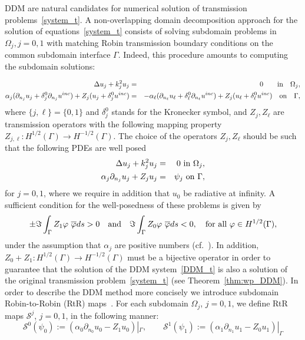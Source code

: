 \documentclass[11pt]{article}
\numberwithin{equation}{section}
\begin{document}
DDM are natural candidates for numerical solution of transmission problems~\eqref{system_t}. A non-overlapping domain decomposition approach for the solution of equations~\eqref{system_t} consists of solving subdomain problems in $\Omega_j,j=0,1$ with matching Robin transmission boundary conditions on the common subdomain interface $\Gamma$. Indeed, this procedure amounts to computing the subdomain solutions:

\begin{eqnarray}\label{DDM_t}
  \Delta u_j +k_j^2 u_j &=&0\qquad {\rm in}\quad \Omega_j,\\
  \alpha_j(\partial_{n_j}u_j+\delta_j^0\partial_{n_j}u^{inc})+Z_j(u_j+\delta_j^0 u^{inc})&=&-\alpha_\ell(\partial_{n_\ell}u_\ell+\delta_\ell^0 \partial_{n_\ell}u^{inc})+Z_j (u_\ell+\delta_\ell^0 u^{inc})\quad{\rm on}\quad \Gamma,\nonumber
\end{eqnarray}
where $\{j,\ell\}=\{0,1\}$ and $\delta_j^0$ stands for the Kronecker symbol, and $Z_j,Z_\ell$ are transmission operators with the following mapping property $Z_{j,\ell}:H^{1/2}(\Gamma)\to {H}^{-1/2}(\Gamma)$. The choice of the operators  $Z_j,Z_\ell$ should be such that the following PDEs are well posed
\begin{eqnarray}\label{domain_eqs_t}
   \Delta u_j+k_j^2u_j&=&0\ {\rm in}\ \Omega_j,\nonumber\\
   \alpha_j\partial_{n_j} u_j+Z_ju_j&=&\psi_j\ {\rm on}\ \Gamma,
\end{eqnarray}
for $j=0,1$, where we require in addition that $u_0$ be radiative at infinity. A sufficient condition for the well-posedness of these problems is given by
\begin{equation}\label{eq:well-pos_t}
  \pm\Im \int_{\Gamma}Z_1\varphi\ \overline{\varphi}ds>0\quad\mbox{and}\quad \Im \int_{\Gamma}Z_0\varphi\ \overline{\varphi}ds<0,\quad{\rm for\ all}\ \varphi\in H^{1/2}(\Gamma),
\end{equation}
under the assumption that $\alpha_j$ are positive numbers (cf.~\cite[Theorem 3.37]{KressColton}). In addition, $Z_0+Z_1:H^{1/2}(\Gamma)\to {H}^{-1/2}(\Gamma)$ must be a bijective operator in order to guarantee that the solution of the DDM system~\eqref{DDM_t} is also a solution of the original transmission problem~\eqref{system_t} (see Theorem~\ref{thm:wp_DDM}).  In order to describe the DDM method more concisely we introduce subdomain Robin-to-Robin (RtR) maps~\cite{Collino1}. For each subdomain $\Omega_j$, $j=0,1$, we define RtR maps $\mathcal{S}^j$, $j=0,1$, in the following manner:
\begin{equation}\label{RtRboxj_t}
   \mathcal{S}^0(\psi_0):=(\alpha_0\partial_{n_0} u_0-Z_1u_0)|_{\Gamma},\qquad \mathcal{S}^1(\psi_1):=(\alpha_1\partial_{n_1} u_1-Z_0u_1)|_{\Gamma}
 \end{equation}
\end{document}
